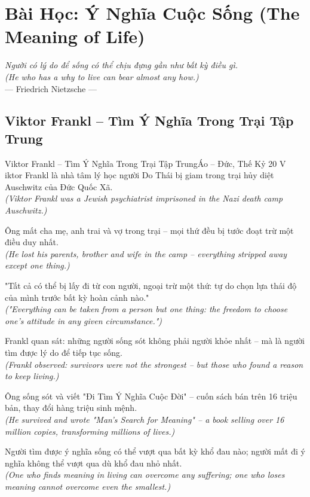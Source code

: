 \chapter{Bài Học: Ý Nghĩa Cuộc Sống (The Meaning of Life)}
\begin{center}
  \textit{\color{truyenblue}Người có lý do để sống có thể chịu đựng gần như bất kỳ điều gì.}\\
  \textit{(He who has a why to live can bear almost any how.)}\\[4pt]
  \small\color{truyengold}--- Friedrich Nietzsche ---
\end{center}
\ngancach

\section{Viktor Frankl -- Tìm Ý Nghĩa Trong Trại Tập Trung}
\begin{truyen}{Viktor Frankl -- Tìm Ý Nghĩa Trong Trại Tập Trung}{Áo -- Đức, Thế Kỷ 20}
V iktor Frankl là nhà tâm lý học người Do Thái bị giam trong trại hủy diệt Auschwitz của Đức Quốc Xã.\\
\textit{(Viktor Frankl was a Jewish psychiatrist imprisoned in the Nazi death camp Auschwitz.)}

Ông mất cha mẹ, anh trai và vợ trong trại -- mọi thứ đều bị tước đoạt trừ một điều duy nhất.\\
\textit{(He lost his parents, brother and wife in the camp -- everything stripped away except one thing.)}

"Tất cả có thể bị lấy đi từ con người, ngoại trừ một thứ: tự do chọn lựa thái độ của mình trước bất kỳ hoàn cảnh nào."\\
\textit{("Everything can be taken from a person but one thing: the freedom to choose one's attitude in any given circumstance.")}

Frankl quan sát: những người sống sót không phải người khỏe nhất -- mà là người tìm được lý do để tiếp tục sống.\\
\textit{(Frankl observed: survivors were not the strongest -- but those who found a reason to keep living.)}

Ông sống sót và viết "Đi Tìm Ý Nghĩa Cuộc Đời" -- cuốn sách bán trên 16 triệu bản, thay đổi hàng triệu sinh mệnh.\\
\textit{(He survived and wrote "Man's Search for Meaning" -- a book selling over 16 million copies, transforming millions of lives.)}

\end{truyen}
\begin{baihoc}
  Người tìm được ý nghĩa sống có thể vượt qua bất kỳ khổ đau nào; người mất đi ý nghĩa không thể vượt qua dù khổ đau nhỏ nhất.\\
  \textit{(One who finds meaning in living can overcome any suffering; one who loses meaning cannot overcome even the smallest.)}
\end{baihoc}

